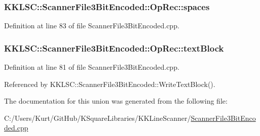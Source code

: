 \subsubsection[{\texorpdfstring{spaces}{spaces}}]{ K\+K\+L\+S\+C\+::\+Scanner\+File3\+Bit\+Encoded\+::\+Op\+Rec\+::spaces}\hypertarget{union_scanner_file3_bit_encoded_1_1_op_rec_a84dd30292d5a11eed9d174961ab5b778}{}\label{union_scanner_file3_bit_encoded_1_1_op_rec_a84dd30292d5a11eed9d174961ab5b778}


Definition at line 83 of file Scanner\+File3\+Bit\+Encoded.\+cpp.

\subsubsection[{\texorpdfstring{text\+Block}{textBlock}}]{ K\+K\+L\+S\+C\+::\+Scanner\+File3\+Bit\+Encoded\+::\+Op\+Rec\+::text\+Block}\hypertarget{union_scanner_file3_bit_encoded_1_1_op_rec_a824f04c1d867a28893b35c5cd72a466d}{}\label{union_scanner_file3_bit_encoded_1_1_op_rec_a824f04c1d867a28893b35c5cd72a466d}


Definition at line 81 of file Scanner\+File3\+Bit\+Encoded.\+cpp.



Referenced by K\+K\+L\+S\+C\+::\+Scanner\+File3\+Bit\+Encoded\+::\+Write\+Text\+Block().



The documentation for this union was generated from the following file\+:\begin{DoxyCompactItemize}
\item 
C\+:/\+Users/\+Kurt/\+Git\+Hub/\+K\+Square\+Libraries/\+K\+K\+Line\+Scanner/\hyperlink{_scanner_file3_bit_encoded_8cpp}{Scanner\+File3\+Bit\+Encoded.\+cpp}\end{DoxyCompactItemize}
